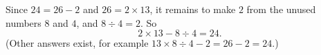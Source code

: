 Since $24=26-2$ and $26=2\times13$, it remains to make $2$ from the unused numbers $8$ and $4$, and $8\div4=2$. So
\[
\boxed{2\times13-8\div4=24}.
\]
(Other answers exist, for example $13\times8\div4-2=26-2=24$.)
